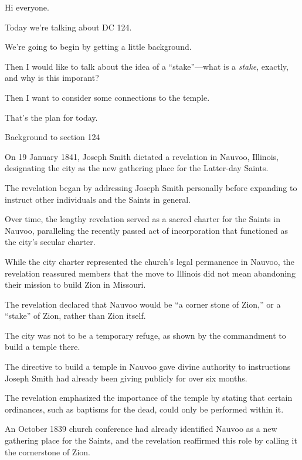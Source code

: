 		\begin{compactitem}

			\item Hi everyone.
				\begin{compactitem}
					\item Today we're talking about DC 124.
					\item We're going to begin by getting a little background.
					\item Then I would like to talk about the idea of a ``stake''---what is a \textit{stake}, exactly, and why is this imporant?
					\item Then I want to consider some connections to the temple.
					\item That's the plan for today.
				\end{compactitem}
				
			\item Background to section 124
				\begin{compactitem}
					\item On 19 January 1841, Joseph Smith dictated a revelation in Nauvoo, Illinois, designating the city as the new gathering place for the Latter-day Saints. 
					\item The revelation began by addressing Joseph Smith personally before expanding to instruct other individuals and the Saints in general. 
					\item Over time, the lengthy revelation served as a sacred charter for the Saints in Nauvoo, paralleling the recently passed act of incorporation that functioned as the city’s secular charter. 
					\item While the city charter represented the church’s legal permanence in Nauvoo, the revelation reassured members that the move to Illinois did not mean abandoning their mission to build Zion in Missouri. 
					\item The revelation declared that Nauvoo would be ``a corner stone of Zion,'' or a ``stake'' of Zion, rather than Zion itself. 
					\item The city was not to be a temporary refuge, as shown by the commandment to build a temple there. 
					\item The directive to build a temple in Nauvoo gave divine authority to instructions Joseph Smith had already been giving publicly for over six months. 
					\item The revelation emphasized the importance of the temple by stating that certain ordinances, such as baptisms for the dead, could only be performed within it. 
					\item An October 1839 church conference had already identified Nauvoo as a new gathering place for the Saints, and the revelation reaffirmed this role by calling it the cornerstone of Zion. 
				\end{compactitem}
				

\end{compactitem}
